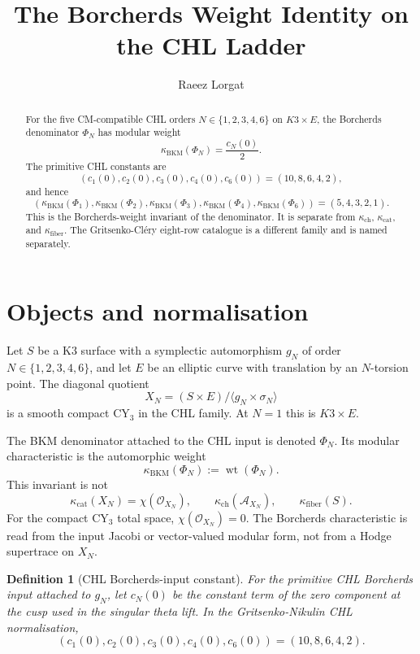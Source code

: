 \documentclass[11pt]{article}
\title{The Borcherds Weight Identity on the CHL Ladder}
\author{Raeez Lorgat}
\date{}
\newtheorem{definition}[theorem]{Definition}
\providecommand{\kBKM}{\kappa_{\mathrm{BKM}}}
\providecommand{\kch}{\kappa_{\mathrm{ch}}}
\providecommand{\kcat}{\kappa_{\mathrm{cat}}}
\providecommand{\kfib}{\kappa_{\mathrm{fiber}}}
\providecommand{\cA}{\mathcal{A}}
\providecommand{\PhiN}{\Phi_N}
\begin{document}
\maketitle

\begin{abstract}
For the five CM-compatible CHL orders
$N\in\{1,2,3,4,6\}$ on $K3\times E$, the Borcherds denominator
$\PhiN$ has modular weight
\[
  \kBKM(\PhiN)=\frac{c_N(0)}{2}.
\]
The primitive CHL constants are
\[
  (c_1(0),c_2(0),c_3(0),c_4(0),c_6(0))
  =(10,8,6,4,2),
\]
and hence
\[
  (\kBKM(\Phi_1),\kBKM(\Phi_2),\kBKM(\Phi_3),
    \kBKM(\Phi_4),\kBKM(\Phi_6))
  =(5,4,3,2,1).
\]
This is the Borcherds-weight invariant of the denominator. It is
separate from $\kch$, $\kcat$, and $\kfib$. The Gritsenko-Cl\'ery
eight-row catalogue is a different family and is named separately.
\end{abstract}

\tableofcontents

\section{Objects and normalisation}
\label{sec:objects-normalisation}

Let $S$ be a K3 surface with a symplectic automorphism $g_N$ of order
$N\in\{1,2,3,4,6\}$, and let $E$ be an elliptic curve with translation
by an $N$-torsion point. The diagonal quotient
\[
  X_N=(S\times E)/\langle g_N\times\sigma_N\rangle
\]
is a smooth compact CY$_3$ in the CHL family. At $N=1$ this is
$K3\times E$.

The BKM denominator attached to the CHL input is denoted $\Phi_N$.
Its modular characteristic is the automorphic weight
\[
  \kBKM(\Phi_N):=\operatorname{wt}(\Phi_N).
\]
This invariant is not
\[
  \kcat(X_N)=\chi(\mathcal O_{X_N}),\qquad
  \kch(\cA_{X_N}),\qquad
  \kfib(S).
\]
For the compact CY$_3$ total space, $\chi(\mathcal O_{X_N})=0$.
The Borcherds characteristic is read from the input Jacobi or
vector-valued modular form, not from a Hodge supertrace on $X_N$.

\begin{definition}[CHL Borcherds-input constant]
\label{def:chl-borcherds-input}
For the primitive CHL Borcherds input attached to $g_N$, let $c_N(0)$ be the
constant term of the zero component at the cusp used in the singular
theta lift. In the Gritsenko-Nikulin CHL normalisation,
\[
  (c_1(0),c_2(0),c_3(0),c_4(0),c_6(0))
  =(10,8,6,4,2).
\]
\end{definition}
\end{document}
